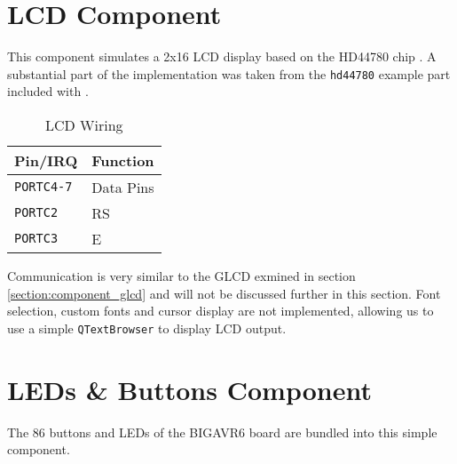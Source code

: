 \section{\acf{LCD} Component} \label{section:component_lcd}

This component simulates a 2x16 \ac{LCD} display based on the HD44780
chip \cite{hitachi01, samsung02, winstar02}. A substantial part of the implementation
was taken from the \verb|hd44780| example part included with \simavr.

\begin{table}[ht]
\centering
\begin{tabular}{ll}
\toprule

Pin/\ac{IRQ}        & Function \\

\midrule

\lstinline|PORTC4-7|& Data Pins\\
\lstinline|PORTC2|  & \acf{RS}\\
\lstinline|PORTC3|  & \acf{E}\\

\bottomrule
\end{tabular}
\caption{\ac{LCD} Wiring}
\label{tab:wiring_lcd}
\end{table}

Communication is very similar to the \ac{GLCD} exmined in section
\ref{section:component_glcd} and will not be discussed further in this section.
Font selection, custom fonts and cursor display are not implemented, allowing us to use
a simple \lstinline|QTextBrowser| to display \ac{LCD} output.

\section{\acfp{LED} \& Buttons Component}

The 86 buttons and \acp{LED} of the BIGAVR6 board are bundled into this simple
component.

